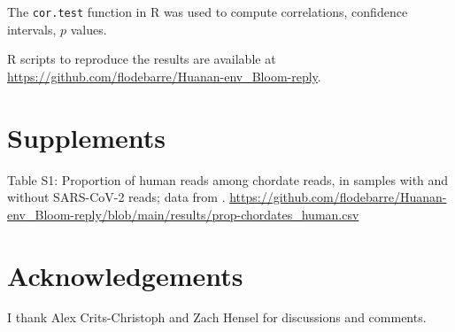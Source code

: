 \documentclass[11pt]{article}
\def \sct {\mbox{SARS-CoV-2}}
\begin{document}
The \texttt{cor.test} function in R was used to compute correlations, confidence intervals, $p$ values.

R scripts to reproduce the results are available at \url{https://github.com/flodebarre/Huanan-env_Bloom-reply}.

\section{Supplements}

Table S1: Proportion of human reads among chordate reads, in samples with and without \sct{} reads; data from \citet{Bloom2023VE}. \url{https://github.com/flodebarre/Huanan-env_Bloom-reply/blob/main/results/prop-chordates_human.csv}

\section{Acknowledgements} I thank Alex Crits-Christoph and Zach Hensel for discussions and comments. 



\end{document}
